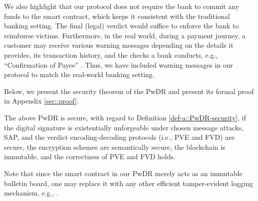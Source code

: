 We also highlight that our protocol does not require the bank to commit any funds to the smart contract, which keeps it consistent with the traditional banking setting. The final (legal) verdict would suffice to enforce the bank to reimburse victims. Furthermore, in the real world, during a payment journey, a customer may receive various warning messages depending on the details it provides, its transaction history, and the checks a bank conducts, e.g., ``Confirmation of Payee'' \cite{CoP}. Thus, we have included warning messages in our protocol to match the real-world banking setting. 

Below, we present the security theorem of the PwDR and present its formal proof in Appendix \ref{sec::proof}. 

\begin{theorem}\label{theorem::PwDR-security}
The above PwDR is secure, with regard to Definition \ref{def-a::PwDR-security}, if the digital signature is existentially unforgeable under chosen message attacks, SAP, and the verdict encoding-decoding protocols (i.e., PVE and FVD) are secure,  the encryption schemes are semantically secure, the blockchain is immutable, and the correctness of PVE and FVD holds. 
\end{theorem}



Note that since the smart contract in our PwDR merely acts as an immutable bulletin board, one may replace it with any other efficient tamper-evident logging mechanism, e.g., \cite{CrosbyW09,Soriano-Salvador21,rfc/rfc6962}. 






%



